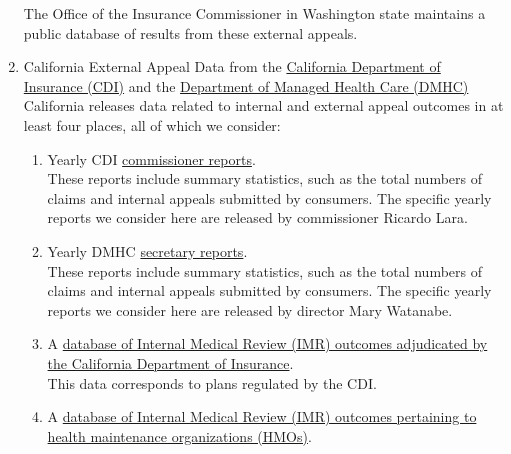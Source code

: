 \documentclass[psamsfonts]{amsart}
\theoremstyle{plain}
\theoremstyle{definition}
\theoremstyle{remark}
\begin{document}
\begin{enumerate}
	The Office of the Insurance Commissioner in Washington state maintains a public database of results from these external appeals.\\
	
	
	\item California External Appeal Data from the \href{https://interactive.web.insurance.ca.gov/apex_extprd/f?p=192:1:2660782937251:::::}{California Department of Insurance (CDI)} and the \href{https://dmhc.ca.gov/AbouttheDMHC/DMHCReports/AnnualReports.aspx}{Department of Managed Health Care (DMHC)}\\
	
	California releases data related to internal and external appeal outcomes in at least four places, all of which we consider:\\
	
	\begin{enumerate}
	\item Yearly CDI \href{https://www.insurance.ca.gov/0400-news/0200-studies-reports/0700-commissioner-report/}{commissioner reports}.\\
	
	These reports include summary statistics, such as the total numbers of claims and internal appeals submitted by consumers. The specific yearly reports we consider here are released by commissioner Ricardo Lara. \\
	
	\item Yearly DMHC \href{https://dmhc.ca.gov/AbouttheDMHC/DMHCReports/AnnualReports.aspx}{secretary reports}.\\
	
	These reports include summary statistics, such as the total numbers of claims and internal appeals submitted by consumers. The specific yearly reports we consider here are released by director Mary Watanabe.\\
	
	\item A \href{https://interactive.web.insurance.ca.gov/apex_extprd/f?p=192:1:5191948876739:::::}{database of Internal Medical Review (IMR) outcomes adjudicated by the California Department of Insurance}.\\
	
	This data corresponds to plans regulated by the CDI.\\
	
	\item A \href{https://data.chhs.ca.gov/dataset/independent-medical-review-imr-determinations-trend}{database of Internal Medical Review (IMR) outcomes pertaining to health maintenance organizations (HMOs)}.\\
	

\end{enumerate}
\end{enumerate}
\end{document}
